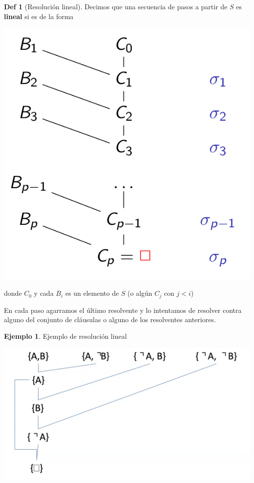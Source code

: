 \documentclass{report}
\theoremstyle{definition} %
\newtheorem*{definition*}{Def}
\newtheorem*{example*}{Ejemplo}
\begin{document}
\begin{definition*}[Resolución lineal]
    Decimos que una secuencia de pasos a partir de $S$ es \textbf{lineal} si es
    de la forma

    \begin{center}
        \includegraphics[scale=0.25]{img/resol/lineal.png}
    \end{center}

    donde $C_0$ y cada $B_i$ es un elemento de $S$ (o algún $C_j$ con $j < i$)

    En cada paso agarramos el último resolvente y lo intentamos de resolver
    contra alguno del conjunto de cláusulas o alguno de los resolventes
    anteriores.
\end{definition*}

\begin{example*}Ejemplo de resolución lineal
    \begin{center}
        \includegraphics[scale=0.25]{img/resol/lineal-ex.png}
    \end{center}
\end{example*}
\end{document}
